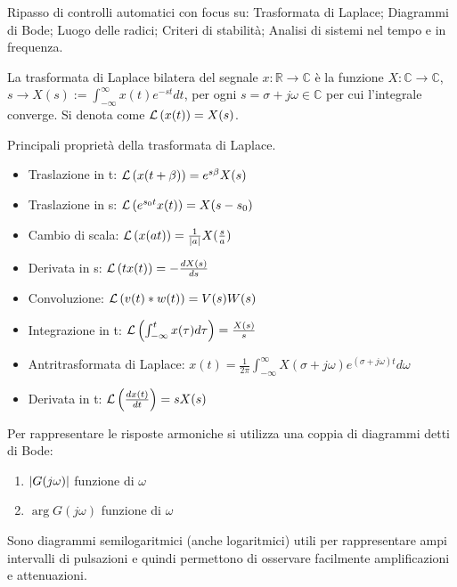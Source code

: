Ripasso di controlli automatici con focus su: Trasformata di Laplace; Diagrammi di Bode; Luogo delle radici; Criteri di stabilità; Analisi di sistemi nel tempo e in frequenza.

La trasformata di Laplace bilatera del segnale $x:\mathbb{R} \rightarrow \mathbb{C}$ è la funzione $X:\mathbb{C} \rightarrow \mathbb{C}$, $s \rightarrow X(s) := \int^\infty_{-\infty} x(t)e^{-st} dt $, per ogni $s=\sigma + j\omega\in \mathbb{C}$ per cui l'integrale converge. Si denota come $\mathcal{L}\left(x(t)\right) = X(s)$.

Principali proprietà della trasformata di Laplace.
\begin{itemize}
    \item Traslazione in t: $\mathcal{L}\left(x(t+\beta)\right) = e^{s\beta}X(s)$
    \item Traslazione in s: $\mathcal{L}\left(e^{s_0t}x(t)\right) = X(s-s_0)$
    \item Cambio di scala: $\mathcal{L}\left(x(at)\right) = \frac{1}{\left|a\right|}X(\frac{s}{a})$
    \item Derivata in s: $\mathcal{L}\left(tx(t)\right)=-\frac{dX(s)}{ds}$
    \item Convoluzione: $\mathcal{L}\left(v(t)*w(t)\right) = V(s)W(s)$
    \item Integrazione in t: $\mathcal{L}\left(\int^t_{-\infty} x(\tau) d\tau \right)=\frac{X(s)}{s}$
    \item Antritrasformata di Laplace: $x(t)=\frac{1}{2\pi} \int^\infty_{-\infty}X(\sigma+j\omega) e^{(\sigma+j\omega)t} d\omega$
    \item Derivata in t: $\mathcal{L}\left(\frac{dx(t)}{dt}\right) = s X(s)$
\end{itemize}



Per rappresentare le risposte armoniche si utilizza una coppia di diagrammi detti di Bode:
\begin{enumerate}
    \item $\left|G(j\omega)\right|$ funzione di $\omega$
    \item $\arg{G(j\omega)}$ funzione di $\omega$
\end{enumerate}

Sono diagrammi semilogaritmici (anche logaritmici) utili per rappresentare ampi intervalli di pulsazioni e quindi permettono di osservare facilmente amplificazioni e attenuazioni.

